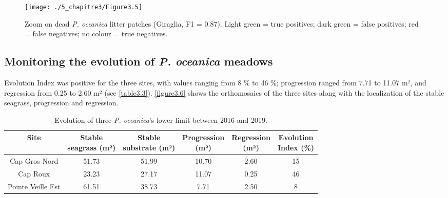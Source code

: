 \begin{figure}[H]
	\begin{center}
	\texttt{[image: ./5\_chapitre3/Figure3.5]}
		\caption[Zoom on dead \textit{P. oceanica} litter patches.]{Zoom on dead \textit{P. oceanica} litter patches (Giraglia, F1 = 0.87). Light green = true positives; dark green = false positives; red = false negatives; no colour = true negatives.}
	\label{figure3.5}
\end{center}
\end{figure}


\subsection{Monitoring the evolution of \textit{P. oceanica} meadows}
Evolution Index was positive for the three sites, with values ranging from 8 \% to 46 \%; progression ranged from 7.71 to 11.07 m², and regression from 0.25 to 2.60 m² (see \autoref{table3.3}). \autoref{figure3.6} shows the orthomosaics of the three sites along with the localization of the stable seagrass, progression and regression.

\begin{table}[htbp]
  \centering
  \normalsize
  \caption[Evolution of three \textit{P. oceanica}’s lower limit between 2016 and 2019.]{Evolution of three \textit{P. oceanica}’s lower limit between 2016 and 2019.}
  \label{table3.3}
    \begin{tabular}{*{6}{c}}
        \toprule
        \textbf{Site} & \makecell{\textbf{Stable} \\ \textbf{seagrass (m²)}} & \makecell{\textbf{Stable} \\ \textbf{substrate (m²)}} & \makecell{\textbf{Progression} \\ \textbf{(m²)}} & \makecell{\textbf{Regression} \\ \textbf{(m²)}} & \makecell{\textbf{Evolution} \\ \textbf{Index (\%)}} \\ \midrule
        Cap   Gros Nord & 51.73 & 51.99 & 10.70 & 2.60 & 15 \\
        Cap   Roux & 23.23 & 27.17 & 11.07 & 0.25 & 46 \\
        Pointe   Veille Est & 61.51 & 38.73 & 7.71 & 2.50 & 8 \\ \bottomrule
    \end{tabular}
\end{table}

